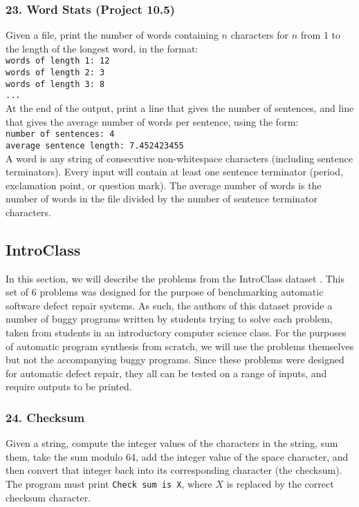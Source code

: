 \documentclass{sig-alternate}
\begin{document}
\subsubsection*{23. Word Stats (Project 10.5)}
Given a file, print the number of words containing $n$ characters for $n$ from 1 to the length of the longest word, in the format:
\texttt{ \\
words of length 1: 12 \\
words of length 2: 3 \\
words of length 3: 8 \\
... \\
} %
At the end of the output, print a line that gives the number of sentences, and line that gives the average number of words per sentence, using the form:
\texttt{ \\
number of sentences: 4 \\
average sentence length: 7.452423455 \\
} %
A word is any string of consecutive non-whitespace characters (including sentence terminators). Every input will contain at least one sentence terminator (period, exclamation point, or question mark). The average number of words is the number of words in the file divided by the number of sentence terminator characters.


\subsection{IntroClass}

In this section, we will describe the problems from the IntroClass dataset \cite{ManyBugsAndIntroClass, Brun13TRgptest}. This set of 6 problems was designed for the purpose of benchmarking automatic software defect repair systems. As such, the authors of this dataset provide a number of buggy programs written by students trying to solve each problem, taken from students in an introductory computer science class. For the purposes of automatic program synthesis from scratch, we will use the problems themselves but not the accompanying buggy programs. Since these problems were designed for automatic defect repair, they all can be tested on a range of inputs, and require outputs to be printed.

\subsubsection*{24. Checksum}
Given a string, compute the integer values of the characters in the string, sum them, take the sum modulo 64, add the integer value of the space character, and then convert that integer back into its corresponding character (the checksum). The program must print \texttt{Check sum is X}, where $X$ is replaced by the correct checksum character.
\end{document}
